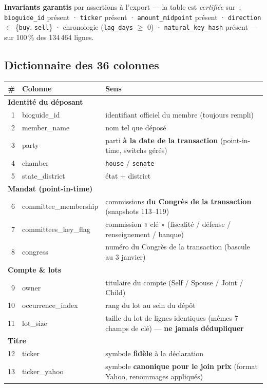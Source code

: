 \documentclass[11pt,a4paper]{article}
\newcommand{\co}[1]{\texttt{\small #1}}
\begin{document}
\textbf{Invariants garantis} par assertions à l'export — la table est \emph{certifiée} sur~:
\co{bioguide_id} présent · \co{ticker} présent · \co{amount_midpoint} présent · \co{direction}
$\in$ \{\co{buy}, \co{sell}\} · chronologie (\co{lag_days} $\geq$ 0) · \co{natural_key_hash} présent —
sur 100\,\% des 134\,464 lignes.

\subsection{Dictionnaire des 36 colonnes}
{\footnotesize
\begin{longtable}{r >{\ttfamily}p{4.1cm} p{10.2cm}}
\toprule
\# & \normalfont\bfseries Colonne & \bfseries Sens \\
\midrule\endhead
\multicolumn{3}{l}{\bfseries Identité du déposant}\\
1 & bioguide_id & identifiant officiel du membre (toujours rempli) \\
2 & member_name & nom tel que déposé \\
3 & party & parti \textbf{à la date de la transaction} (point-in-time, switchs gérés) \\
4 & chamber & \co{house} / \co{senate} \\
5 & state_district & état + district \\
\midrule
\multicolumn{3}{l}{\bfseries Mandat (point-in-time)}\\
6 & committee_membership & commissions \textbf{du Congrès de la transaction} (snapshots 113--119) \\
7 & committees_key_flag & commission « clé » (fiscalité / défense / renseignement / banque) \\
8 & congress & numéro du Congrès de la transaction (bascule au 3 janvier) \\
\midrule
\multicolumn{3}{l}{\bfseries Compte \& lots}\\
9 & owner & titulaire du compte (Self / Spouse / Joint / Child) \\
10 & occurrence_index & rang du lot au sein du dépôt \\
11 & lot_size & taille du lot de lignes identiques (mêmes 7 champs de clé) — \textbf{ne jamais dédupliquer} \\
\midrule
\multicolumn{3}{l}{\bfseries Titre}\\
12 & ticker & symbole \textbf{fidèle} à la déclaration \\
13 & ticker_yahoo & symbole \textbf{canonique pour le join prix} (format Yahoo, renommages appliqués) \\

\end{longtable}}
\end{document}
